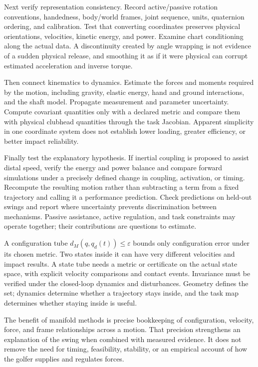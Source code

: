 Next verify representation consistency. Record active/passive rotation
conventions, handedness, body/world frames, joint sequence, units, quaternion
ordering, and calibration. Test that converting coordinates preserves physical
orientations, velocities, kinetic energy, and power. Examine chart conditioning
along the actual data. A discontinuity created by angle wrapping is not
evidence of a sudden physical release, and smoothing it as if it were physical
can corrupt estimated acceleration and inverse torque.

Then connect kinematics to dynamics. Estimate the forces and moments required
by the motion, including gravity, elastic energy, hand and ground interactions,
and the shaft model. Propagate measurement and parameter uncertainty. Compute
covariant quantities only with a declared metric and compare them with physical
clubhead quantities through the task Jacobian. Apparent simplicity in one
coordinate system does not establish lower loading, greater efficiency, or
better impact reliability.

Finally test the explanatory hypothesis. If inertial coupling is proposed to
assist distal speed, verify the energy and power balance and compare forward
simulations under a precisely defined change in coupling, activation, or timing.
Recompute the resulting motion rather than subtracting a term from a fixed
trajectory and calling it a performance prediction. Check predictions on
held-out swings and report where uncertainty prevents discrimination between
mechanisms. Passive assistance, active regulation, and task constraints may
operate together; their contributions are questions to estimate.

A configuration tube $d_M(q,q_d(t))\leq\varepsilon$ bounds only configuration
error under its chosen metric. Two states inside it can have very different
velocities and impact results. A state tube needs a metric or certificate on
the actual state space, with explicit velocity comparisons and contact events.
Invariance must be verified under the closed-loop dynamics and disturbances.
Geometry defines the set; dynamics determine whether a trajectory stays inside,
and the task map determines whether staying inside is useful.

The benefit of manifold methods is precise bookkeeping of configuration,
velocity, force, and frame relationships across a motion. That precision
strengthens an explanation of the swing when combined with measured evidence.
It does not remove the need for timing, feasibility, stability, or an empirical
account of how the golfer supplies and regulates forces.

